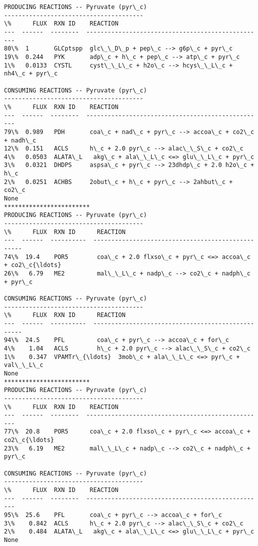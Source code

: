 \documentclass[11pt]{article}
\begin{document}
    \begin{Verbatim}[commandchars=\\\{\}]
PRODUCING REACTIONS -- Pyruvate (pyr\_c)
---------------------------------------
\%      FLUX  RXN ID    REACTION
---  ------  --------  --------------------------------------------------
80\%  1       GLCptspp  glc\_\_D\_p + pep\_c --> g6p\_c + pyr\_c
19\%  0.244   PYK       adp\_c + h\_c + pep\_c --> atp\_c + pyr\_c
1\%   0.0133  CYSTL     cyst\_\_L\_c + h2o\_c --> hcys\_\_L\_c + nh4\_c + pyr\_c

CONSUMING REACTIONS -- Pyruvate (pyr\_c)
---------------------------------------
\%      FLUX  RXN ID    REACTION
---  ------  --------  --------------------------------------------------
79\%  0.989   PDH       coa\_c + nad\_c + pyr\_c --> accoa\_c + co2\_c + nadh\_c
12\%  0.151   ACLS      h\_c + 2.0 pyr\_c --> alac\_\_S\_c + co2\_c
4\%   0.0503  ALATA\_L   akg\_c + ala\_\_L\_c <=> glu\_\_L\_c + pyr\_c
3\%   0.0321  DHDPS     aspsa\_c + pyr\_c --> 23dhdp\_c + 2.0 h2o\_c + h\_c
2\%   0.0251  ACHBS     2obut\_c + h\_c + pyr\_c --> 2ahbut\_c + co2\_c
None
************************
PRODUCING REACTIONS -- Pyruvate (pyr\_c)
---------------------------------------
\%      FLUX  RXN ID      REACTION
---  ------  ----------  --------------------------------------------------
74\%  19.4    POR5        coa\_c + 2.0 flxso\_c + pyr\_c <=> accoa\_c + co2\_c{\ldots}
26\%   6.79   ME2         mal\_\_L\_c + nadp\_c --> co2\_c + nadph\_c + pyr\_c

CONSUMING REACTIONS -- Pyruvate (pyr\_c)
---------------------------------------
\%      FLUX  RXN ID      REACTION
---  ------  ----------  --------------------------------------------------
94\%  24.5    PFL         coa\_c + pyr\_c --> accoa\_c + for\_c
4\%    1.04   ACLS        h\_c + 2.0 pyr\_c --> alac\_\_S\_c + co2\_c
1\%    0.347  VPAMTr\_{\ldots}  3mob\_c + ala\_\_L\_c <=> pyr\_c + val\_\_L\_c
None
************************
PRODUCING REACTIONS -- Pyruvate (pyr\_c)
---------------------------------------
\%      FLUX  RXN ID    REACTION
---  ------  --------  --------------------------------------------------
77\%  20.8    POR5      coa\_c + 2.0 flxso\_c + pyr\_c <=> accoa\_c + co2\_c{\ldots}
23\%   6.19   ME2       mal\_\_L\_c + nadp\_c --> co2\_c + nadph\_c + pyr\_c

CONSUMING REACTIONS -- Pyruvate (pyr\_c)
---------------------------------------
\%      FLUX  RXN ID    REACTION
---  ------  --------  --------------------------------------------------
95\%  25.6    PFL       coa\_c + pyr\_c --> accoa\_c + for\_c
3\%    0.842  ACLS      h\_c + 2.0 pyr\_c --> alac\_\_S\_c + co2\_c
2\%    0.484  ALATA\_L   akg\_c + ala\_\_L\_c <=> glu\_\_L\_c + pyr\_c
None

    \end{Verbatim}
\end{document}
